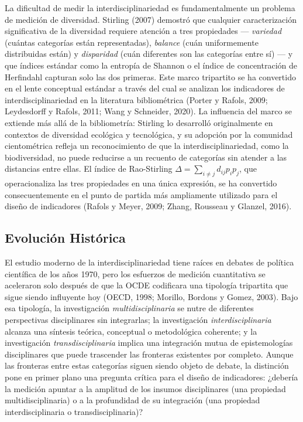 \documentclass[
]{article}
\begin{document}
La dificultad de medir la interdisciplinariedad es fundamentalmente un
problema de medición de diversidad. Stirling (2007) demostró que
cualquier caracterización significativa de la diversidad requiere
atención a tres propiedades --- \emph{variedad} (cuántas categorías
están representadas), \emph{balance} (cuán uniformemente distribuidas
están) y \emph{disparidad} (cuán diferentes son las categorías entre sí)
--- y que índices estándar como la entropía de Shannon o el índice de
concentración de Herfindahl capturan solo las dos primeras. Este marco
tripartito se ha convertido en el lente conceptual estándar a través del
cual se analizan los indicadores de interdisciplinariedad en la
literatura bibliométrica (Porter y Rafols, 2009; Leydesdorff y Rafols,
2011; Wang y Schneider, 2020). La influencia del marco se extiende más
allá de la bibliometría: Stirling lo desarrolló originalmente en
contextos de diversidad ecológica y tecnológica, y su adopción por la
comunidad cientométrica refleja un reconocimiento de que la
interdisciplinariedad, como la biodiversidad, no puede reducirse a un
recuento de categorías sin atender a las distancias entre ellas. El
índice de Rao-Stirling \(\Delta = \sum_{i \neq j} d_{ij} p_i p_j\), que
operacionaliza las tres propiedades en una única expresión, se ha
convertido consecuentemente en el punto de partida más ampliamente
utilizado para el diseño de indicadores (Rafols y Meyer, 2009; Zhang,
Rousseau y Glanzel, 2016).

\hypertarget{evoluciuxf3n-histuxf3rica}{%
\subsection{Evolución Histórica}\label{evoluciuxf3n-histuxf3rica}}

El estudio moderno de la interdisciplinariedad tiene raíces en debates
de política científica de los años 1970, pero los esfuerzos de medición
cuantitativa se aceleraron solo después de que la OCDE codificara una
tipología tripartita que sigue siendo influyente hoy (OECD, 1998;
Morillo, Bordons y Gomez, 2003). Bajo esa tipología, la investigación
\emph{multidisciplinaria} se nutre de diferentes perspectivas
disciplinares sin integrarlas; la investigación
\emph{interdisciplinaria} alcanza una síntesis teórica, conceptual o
metodológica coherente; y la investigación \emph{transdisciplinaria}
implica una integración mutua de epistemologías disciplinares que puede
trascender las fronteras existentes por completo. Aunque las fronteras
entre estas categorías siguen siendo objeto de debate, la distinción
pone en primer plano una pregunta crítica para el diseño de indicadores:
¿debería la medición apuntar a la amplitud de los insumos disciplinares
(una propiedad multidisciplinaria) o a la profundidad de su integración
(una propiedad interdisciplinaria o transdisciplinaria)?
\end{document}
